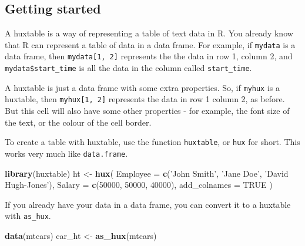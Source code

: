 \documentclass[]{article}
\newenvironment{Shaded}{\begin{snugshade}}{\end{snugshade}}
\newcommand{\KeywordTok}[1]{\textcolor[rgb]{0.13,0.29,0.53}{\textbf{#1}}}
\newcommand{\DataTypeTok}[1]{\textcolor[rgb]{0.13,0.29,0.53}{#1}}
\newcommand{\DecValTok}[1]{\textcolor[rgb]{0.00,0.00,0.81}{#1}}
\newcommand{\StringTok}[1]{\textcolor[rgb]{0.31,0.60,0.02}{#1}}
\newcommand{\OtherTok}[1]{\textcolor[rgb]{0.56,0.35,0.01}{#1}}
\newcommand{\NormalTok}[1]{#1}
\begin{document}
\FloatBarrier

\subsection{Getting started}\label{getting-started}

A huxtable is a way of representing a table of text data in R. You
already know that R can represent a table of data in a data frame. For
example, if \texttt{mydata} is a data frame, then
\texttt{mydata{[}1,\ 2{]}} represents the the data in row 1, column 2,
and \texttt{mydata\$start\_time} is all the data in the column called
\texttt{start\_time}.

A huxtable is just a data frame with some extra properties. So, if
\texttt{myhux} is a huxtable, then \texttt{myhux{[}1,\ 2{]}} represents
the data in row 1 column 2, as before. But this cell will also have some
other properties - for example, the font size of the text, or the colour
of the cell border.

To create a table with huxtable, use the function \texttt{huxtable}, or
\texttt{hux} for short. This works very much like \texttt{data.frame}.

\begin{Shaded}
\begin{Highlighting}[]
\KeywordTok{library}\NormalTok{(huxtable)}
\NormalTok{ht <-}\StringTok{ }\KeywordTok{hux}\NormalTok{(}
        \DataTypeTok{Employee     =} \KeywordTok{c}\NormalTok{(}\StringTok{'John Smith'}\NormalTok{, }\StringTok{'Jane Doe'}\NormalTok{, }\StringTok{'David Hugh-Jones'}\NormalTok{), }
        \DataTypeTok{Salary       =} \KeywordTok{c}\NormalTok{(}\DecValTok{50000}\NormalTok{, }\DecValTok{50000}\NormalTok{, }\DecValTok{40000}\NormalTok{),}
        \DataTypeTok{add_colnames =} \OtherTok{TRUE}
\NormalTok{      )}
\end{Highlighting}
\end{Shaded}

\FloatBarrier

If you already have your data in a data frame, you can convert it to a
huxtable with \texttt{as\_hux}.

\begin{Shaded}
\begin{Highlighting}[]
\KeywordTok{data}\NormalTok{(mtcars)}
\NormalTok{car_ht <-}\StringTok{ }\KeywordTok{as_hux}\NormalTok{(mtcars)}
\end{Highlighting}
\end{Shaded}
\end{document}
